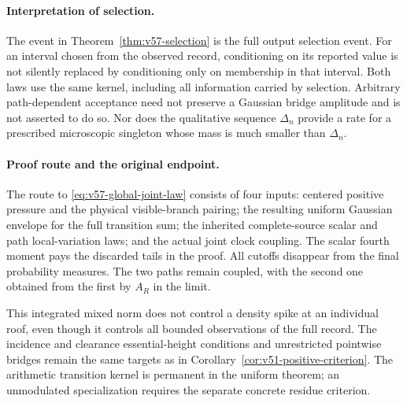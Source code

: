 \paragraph{Interpretation of selection.}
The event in Theorem~\ref{thm:v57-selection} is the full output
selection event. For an interval chosen from the observed record,
conditioning on its reported value is not silently replaced by
conditioning only on membership in that interval. Both laws use the
same kernel, including all information carried by selection. Arbitrary
path-dependent acceptance need not preserve a Gaussian bridge
amplitude and is not asserted to do so. Nor does the qualitative
sequence $\Delta_n$ provide a rate for a prescribed microscopic
singleton whose mass is much smaller than $\Delta_n$.

\paragraph{Proof route and the original endpoint.}
The route to \eqref{eq:v57-global-joint-law} consists of four inputs:
centered positive pressure and the physical visible-branch pairing;
the resulting uniform Gaussian envelope for the full transition sum;
the inherited complete-source scalar and path local-variation laws;
and the actual joint clock coupling. The scalar fourth moment pays
the discarded tails in the proof. All cutoffs disappear from the final
probability measures. The two paths remain coupled, with the second
one obtained from the first by $A_R$ in the limit.

This integrated mixed norm does not control a density spike at an
individual roof, even though it controls all bounded observations of
the full record. The incidence and clearance essential-height
conditions and unrestricted pointwise bridges remain the same targets
as in Corollary~\ref{cor:v51-positive-criterion}. The arithmetic
transition kernel is permanent in the uniform theorem; an unmodulated
specialization requires the separate concrete residue criterion.
